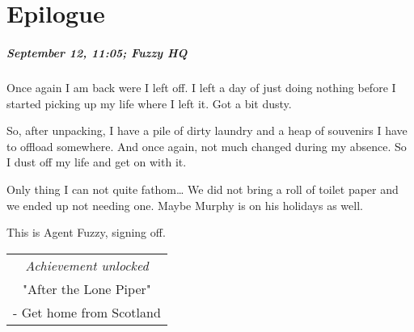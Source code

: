 \chapter{Epilogue}

\paragraph{September 12, 11:05; Fuzzy HQ}
Once again I am back were I left off.
I left a day of just doing nothing before I started picking up my life where I left it.
Got a bit dusty.

So, after unpacking, I have a pile of dirty laundry and a heap of souvenirs I have to offload somewhere.
And once again, not much changed during my absence.
So I dust off my life and get on with it.

Only thing I can not quite fathom\ldots{}
We did not bring a roll of toilet paper and we ended up not needing one.
Maybe Murphy is on his holidays as well.

This is Agent Fuzzy, signing off.

\begin{center}
\begin{tabular}{||c||}
\emph{Achievement unlocked}\\
"After the Lone Piper"\\
\multicolumn{1}{||p{0.8\textwidth}||}{\footnotesize - Get home from Scotland} \\
\end{tabular}
\end{center}


